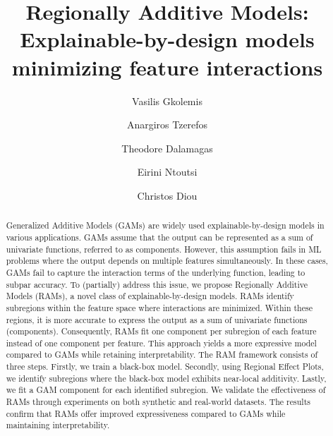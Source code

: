 \documentclass[runningheads]{llncs}
\begin{document}
%
\title{Regionally Additive Models: Explainable-by-design models minimizing feature interactions}


\author{
  Vasilis Gkolemis %
  \and
  Anargiros Tzerefos %
  \and
  Theodore Dalamagas %
  \and
  Eirini Ntoutsi %
  \and
  Christos Diou %
}
%
%
%
\maketitle              %
%
\begin{abstract}
Generalized Additive Models (GAMs) are widely used explainable-by-design models in various applications.
GAMs assume that the output can be represented as a sum of univariate functions, referred to as components.
However, this assumption fails in ML problems where the output depends on multiple features simultaneously.
In these cases, GAMs fail to capture the interaction terms of the underlying function, leading to subpar accuracy.
To (partially) address this issue, we propose Regionally Additive Models (RAMs), a novel class of explainable-by-design models.
RAMs identify subregions within the feature space where interactions are minimized.
Within these regions, it is more accurate to express the output as a sum of univariate functions (components).
Consequently, RAMs fit one component per subregion of each feature instead of one component per feature.
This approach yields a more expressive model compared to GAMs while retaining interpretability.
The RAM framework consists of three steps.
Firstly, we train a black-box model.
Secondly, using Regional Effect Plots, we identify subregions where the black-box model exhibits near-local additivity.
Lastly, we fit a GAM component for each identified subregion.
We validate the effectiveness of RAMs through experiments on both synthetic and real-world datasets.
The results confirm that RAMs offer improved expressiveness compared to GAMs while maintaining interpretability.
\end{abstract}
%
%
%
\end{document}
